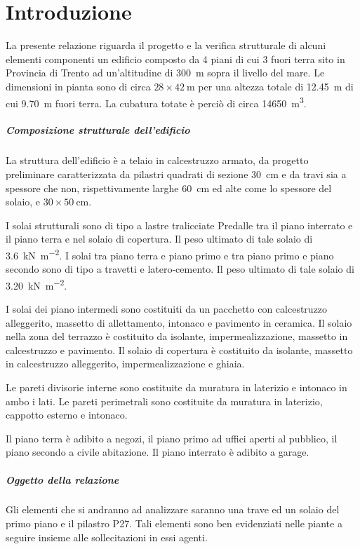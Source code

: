 \chapter{Introduzione}
La presente relazione riguarda il progetto e la verifica strutturale di alcuni elementi componenti un edificio composto da 4 piani di cui 3 fuori terra sito in Provincia di Trento ad un'altitudine di \SI{300}{\meter} sopra il livello del mare.
Le dimensioni in pianta sono di circa $28 \times \SI{42}{\metre}$ per una altezza totale di \SI{12.45}{\meter} di cui \SI{9.70}{\meter} fuori terra. 
La cubatura totate è perciò di circa \SI{14650}{\metre\cubed}.

\paragraph{Composizione strutturale dell'edificio}
La struttura dell'edificio è a telaio in calcestruzzo armato, da progetto preliminare caratterizzata da pilastri quadrati di sezione \SI{30}{\centi\meter} e da travi sia a spessore che non, rispettivamente larghe \SI{60}{\centi\meter} ed alte come lo spessore del solaio, e $30 \times \SI{50}{\centi\metre}$.

I solai strutturali sono di tipo a lastre tralicciate Predalle tra il piano interrato e il piano terra e nel solaio di copertura. 
Il peso ultimato di tale solaio di \SI{3.6}{\kilo\newton\per\square\meter}.
I solai tra piano terra e piano primo e tra piano primo e piano secondo sono di tipo a travetti e latero-cemento.
Il peso ultimato di tale solaio di \SI{3.20}{\kilo\newton\per\square\meter}.

I solai dei piano intermedi sono costituiti da un pacchetto con calcestruzzo alleggerito, massetto di allettamento, intonaco e pavimento in ceramica.
Il solaio nella zona del terrazzo è costituito da isolante, impermealizzazione, massetto in calcestruzzo e pavimento.
Il solaio di copertura è costituito da isolante, massetto in calcestruzzo alleggerito, impermealizzazione e ghiaia.

Le pareti divisorie interne sono costituite da muratura in laterizio e intonaco in ambo i lati.
Le pareti perimetrali sono costituite da muratura in laterizio, cappotto esterno e intonaco.

Il piano terra è adibito a negozi, il piano primo ad uffici aperti al pubblico, il piano secondo a civile abitazione.
Il piano interrato è adibito a garage.

\paragraph{Oggetto della relazione}
Gli elementi che si andranno ad analizzare saranno una trave ed un solaio del primo piano e il pilastro P27. 
Tali elementi sono ben evidenziati nelle piante a seguire insieme alle sollecitazioni in essi agenti.

